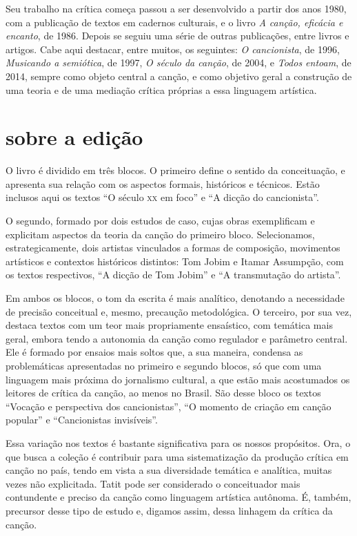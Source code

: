Seu trabalho na crítica começa passou a ser desenvolvido a partir dos anos 1980,
com a publicação de textos em cadernos culturais, e o livro
\textit{A canção, eficácia e encanto}, de 1986. Depois se seguiu uma série de
outras publicações, entre livros e artigos. Cabe aqui destacar, entre
muitos, os seguintes: \textit{O cancionista}, de 1996, \textit{Musicando a
semiótica}, de 1997, \textit{O século da canção}, de 2004, e \textit{Todos entoam}, de 2014, sempre como objeto central a canção, e como objetivo geral
a construção de uma teoria e de uma mediação crítica próprias a essa
linguagem artística.

\section{sobre a edição}

O livro é dividido em três blocos. O primeiro
define o sentido da conceituação, e apresenta sua relação com
os aspectos formais, históricos e técnicos. Estão inclusos aqui os
textos ``O século \textsc{xx} em foco'' e ``A dicção do
cancionista''.

O segundo, formado por dois estudos de caso, cujas obras
exemplificam e explicitam aspectos da teoria da canção do primeiro
bloco. Selecionamos, estrategicamente, dois artistas vinculados a formas
de composição, movimentos artísticos e contextos históricos distintos:
Tom Jobim e Itamar Assumpção, com os textos respectivos, ``A dicção
de Tom Jobim'' e ``A transmutação do artista''.

Em ambos os blocos, o tom da escrita é mais analítico, denotando a
necessidade de precisão conceitual e, mesmo, precaução metodológica.
O terceiro, por sua vez, destaca textos com um teor mais
propriamente ensaístico, com temática mais geral, embora tendo a
autonomia da canção como regulador e parâmetro central. Ele é formado
por ensaios mais soltos que, a sua maneira, condensa as problemáticas
apresentadas no primeiro e segundo blocos, só que com uma linguagem mais
próxima do jornalismo cultural, a que estão mais acostumados os leitores
de crítica da canção, ao menos no Brasil. São desse bloco os textos
``Vocação e perspectiva dos cancionistas'', ``O momento de
criação em canção popular'' e ``Cancionistas invisíveis''.

Essa variação nos textos é bastante significativa para os nossos
propósitos. Ora, o que busca a coleção é contribuir para uma
sistematização da produção crítica em canção no país, tendo em vista a
sua diversidade temática e analítica, muitas vezes não explicitada.
Tatit pode ser considerado o conceituador mais contundente e preciso da
canção como linguagem artística autônoma. É, também, precursor desse
tipo de estudo e, digamos assim, dessa linhagem da crítica da canção.

